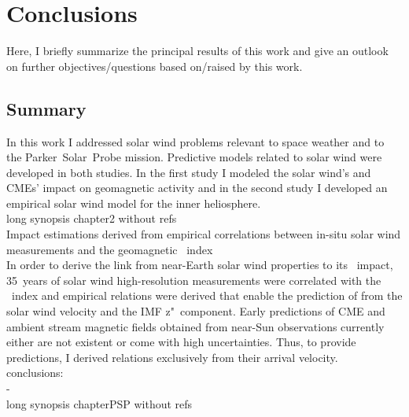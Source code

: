 
\chapter{Conclusions}
\label{chap:summary}

Here, I briefly summarize the principal results of this work and give an outlook on further objectives/questions based on/raised by this work.

\section{Summary}

In this work I addressed solar wind problems relevant to space weather and to the Parker~Solar~Probe mission. Predictive models related to solar wind were developed in both studies. In the first study I modeled the solar wind's and CMEs' impact on geomagnetic activity and in the second study I developed an empirical solar wind model for the inner heliosphere.\\


long synopsis chapter2 without refs\\

Impact estimations derived from empirical correlations between in-situ solar wind measurements and the geomagnetic \Kp{}~index\\

In order to derive the link from near-Earth solar wind properties to its \Kp{}~impact, 35~years of solar wind high-resolution measurements were correlated with the \Kp~index and empirical relations were derived that enable the prediction of \Kp{} from the solar wind velocity and the IMF z"~component. Early predictions of CME and ambient stream magnetic fields obtained from near-Sun observations currently either are not existent or come with high uncertainties. Thus, to provide \Kp{} predictions, I derived relations exclusively from their arrival velocity.\\


conclusions:\\
- \\


long synopsis chapterPSP without refs\\

